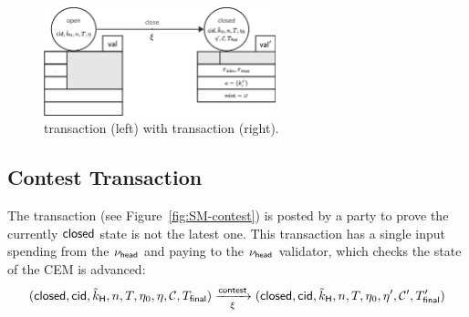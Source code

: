 \begin{figure}[h]
  \centering
  \includegraphics[width=0.6\textwidth]{figures/SM-close.pdf}
  \caption{\mtxCCom{} transaction (left) with \mtxClose{} transaction
    (right).}\label{fig:SM-close}
\end{figure}

\subsection{Contest Transaction}\label{sec:contest-tx}

The \mtxContest{} transaction (see Figure~\ref{fig:SM-contest}) is posted
by a party to prove the currently $\mathsf{closed}$ state is not the latest one. This
transaction has a single input spending from the $\nu_\mathsf{head}$ and paying to the
$\nu_\mathsf{head}$ validator, which checks the state of the CEM is advanced:
\[
  (\mathsf{closed},\mathsf{cid},\tilde{k}_{\mathsf{H}},n,T,\eta_0,\eta,\mathcal{C},T_{\mathsf{final}}) \xrightarrow[\xi]{\mathsf{contest}} (\mathsf{closed},\mathsf{cid},\tilde{k}_{\mathsf{H}},n,T,\eta_0,\eta',\mathcal{C}',T_{\mathsf{final}}')
\]

